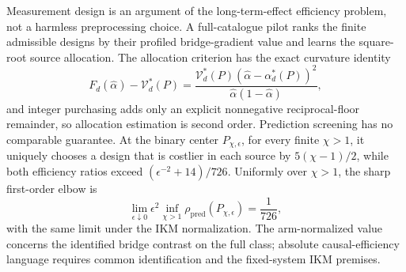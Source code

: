 Measurement design is an argument of the long-term-effect efficiency problem, not a harmless preprocessing choice. A full-catalogue pilot ranks the finite admissible designs by their profiled bridge-gradient value and learns the square-root source allocation. The allocation criterion has the exact curvature identity
\[
 F_d(\widehat\alpha)-\mathcal V_d^*(P)
 =\frac{\mathcal V_d^*(P)(\widehat\alpha-\alpha_d^*(P))^2}
 {\widehat\alpha(1-\widehat\alpha)},
\]
and integer purchasing adds only an explicit nonnegative reciprocal-floor remainder, so allocation estimation is second order. Prediction screening has no comparable guarantee. At the binary center \(P_{\chi,\epsilon}\), for every finite \(\chi>1\), it uniquely chooses a design that is costlier in each source by \(5(\chi-1)/2\), while both efficiency ratios exceed \((\epsilon^{-2}+14)/726\). Uniformly over \(\chi>1\), the sharp first-order elbow is
\[
 \lim_{\epsilon\downarrow0}\epsilon^2
 \inf_{\chi>1}\rho_{\mathrm{pred}}(P_{\chi,\epsilon})
 =\frac1{726},
\]
with the same limit under the IKM normalization. The arm-normalized value concerns the identified bridge contrast on the full class; absolute causal-efficiency language requires common identification and the fixed-system IKM premises.